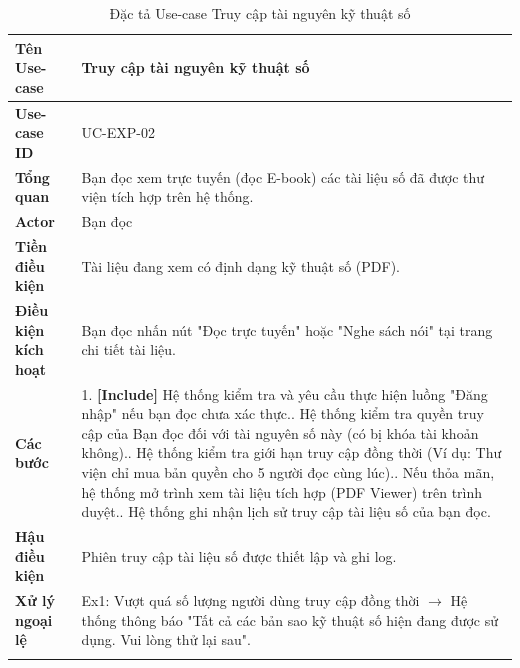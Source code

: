 \newpage
\begin{longtable}{|p{3.5cm}|p{11.5cm}|}
    \hline
    \textbf{Tên Use-case} & \textbf{Truy cập tài nguyên kỹ thuật số} \\
    \hline
    \textbf{Use-case ID} & UC-EXP-02 \\
    \hline
    \textbf{Tổng quan} & Bạn đọc xem trực tuyến (đọc E-book) các tài liệu số đã được thư viện tích hợp trên hệ thống. \\
    \hline
    \textbf{Actor} & Bạn đọc \\
    \hline
    \textbf{Tiền điều kiện} & Tài liệu đang xem có định dạng kỹ thuật số (PDF). \\
    \hline
    \textbf{Điều kiện kích hoạt} & Bạn đọc nhấn nút "Đọc trực tuyến" hoặc "Nghe sách nói" tại trang chi tiết tài liệu. \\
    \hline
    \textbf{Các bước} & 
    1. \textbf{[Include]} Hệ thống kiểm tra và yêu cầu thực hiện luồng "Đăng nhập" nếu bạn đọc chưa xác thực.\newline
    2. Hệ thống kiểm tra quyền truy cập của Bạn đọc đối với tài nguyên số này (có bị khóa tài khoản không).\newline
    3. Hệ thống kiểm tra giới hạn truy cập đồng thời (Ví dụ: Thư viện chỉ mua bản quyền cho 5 người đọc cùng lúc).\newline
    4. Nếu thỏa mãn, hệ thống mở trình xem tài liệu tích hợp (PDF Viewer) trên trình duyệt.\newline
    5. Hệ thống ghi nhận lịch sử truy cập tài liệu số của bạn đọc. \\
    \hline
    \textbf{Hậu điều kiện} & Phiên truy cập tài liệu số được thiết lập và ghi log. \\
    \hline
    \textbf{Xử lý ngoại lệ} & 
    Ex1: Vượt quá số lượng người dùng truy cập đồng thời $\rightarrow$ Hệ thống thông báo "Tất cả các bản sao kỹ thuật số hiện đang được sử dụng. Vui lòng thử lại sau". \\
    \hline
    \caption{Đặc tả Use-case Truy cập tài nguyên kỹ thuật số}
\end{longtable}

